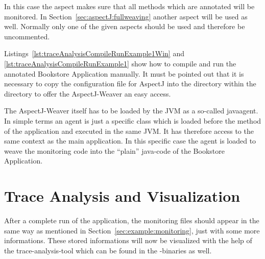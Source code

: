 In this case the aspect makes sure that all methods which are annotated will be monitored. In Section~\ref{sec:aspectJ:fullweaving} another aspect will be used as well. Normally only one of the given aspects should be used and therefore be uncommented.

Listings~\ref{lst:traceAnalysisCompileRunExample1Win} and \ref{lst:traceAnalysisCompileRunExample1} show how to compile and run the annotated Bookstore Application manually. It must be pointed out that it is necessary to copy the configuration file for AspectJ into the  directory within the  directory to offer the AspectJ-Weaver an easy access.

The AspectJ-Weaver itself has to be loaded by the JVM as a so-called javaagent. In simple terms an agent is just a specific class which is loaded before the  method of the application and executed in the same JVM. It has therefore access to the same context as the main application. In this specific case the agent is loaded to weave the monitoring code into the ``plain'' java-code of the Bookstore Application.

\setBashListing



\section{Trace Analysis and Visualization}\label{sec:traceAnalysisTool}

After a complete run of the application, the monitoring files should appear in the same way as mentioned in Section~\ref{sec:example:monitoring}, just with some more informations. These stored informations will now be visualized with the help of the trace-analysis-tool which can be found in the \Kieker{}-binaries as well.\\

 \vspace{3mm}

